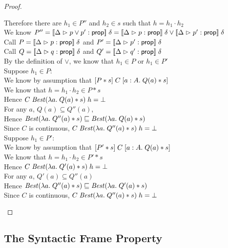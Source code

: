 \begin{proof}
\begin{tabbedproof}
    \oooooo Therefore there are $h_1 \in P''$ and $h_2 \in s$ such that $h = h_1 \cdot h_2$ \\
    \oooooo We know $P'' = [\![{{\Delta} \vartriangleright {p \vee p'} : {\mathsf{prop}}}]\!]\;\delta = 
                           [\![{{\Delta} \vartriangleright {p} : {\mathsf{prop}}}]\!]\;\delta \vee 
                           [\![{{\Delta} \vartriangleright {p'} : {\mathsf{prop}}}]\!]\;\delta$ \\ 
    \oooooo Call $P = [\![{{\Delta} \vartriangleright {p} : {\mathsf{prop}}}]\!]\;\delta$ and $P' = [\![{{\Delta} \vartriangleright {p'} : {\mathsf{prop}}}]\!]\;\delta$ \\
    \oooooo Call $Q = [\![{{\Delta} \vartriangleright {q} : {\mathsf{prop}}}]\!]\;\delta$ and $Q' = [\![{{\Delta} \vartriangleright {q'} : {\mathsf{prop}}}]\!]\;\delta$ \\
    \oooooo By the definition of $\vee$, we know that $h_1 \in P$ or $h_1 \in P'$ \\
    \oooooo Suppose $h_1 \in P$: \\
    \ooooooo We know by assumption that $[{P * s}]\;{C}\;[{a:A}.\;{Q(a) * s}]$ \\
    \ooooooo We know that $h = h_1 \cdot h_2 \in P * s$ \\
    \ooooooo Hence $C\;\mathit{Best}(\lambda a.\;Q(a) * s)\;h = \bot$ \\
    \ooooooo For any $a$, $Q(a) \subseteq Q''(a)$, \\
    \ooooooo Hence $\mathit{Best}(\lambda a.\;Q''(a) * s) \sqsubseteq \mathit{Best}(\lambda a.\;Q(a) * s)$ \\ 
    \ooooooo Since $C$ is continuous, $C\;\mathit{Best}(\lambda a.\;Q''(a) * s)\;h = \bot$ \\
    \oooooo Suppose $h_1 \in P'$: \\
    \ooooooo We know by assumption that $[{P' * s}]\;{C}\;[{a:A}.\;{Q(a) * s}]$ \\
    \ooooooo We know that $h = h_1 \cdot h_2 \in P' * s$ \\
    \ooooooo Hence $C\;\mathit{Best}(\lambda a.\;Q'(a) * s)\;h = \bot$ \\
    \ooooooo For any $a$, $Q'(a) \subseteq Q''(a)$ \\
    \ooooooo Hence $\mathit{Best}(\lambda a.\;Q''(a) * s) \sqsubseteq \mathit{Best}(\lambda a.\;Q'(a) * s)$ \\
    \ooooooo Since $C$ is continuous, $C\;\mathit{Best}(\lambda a.\;Q''(a) * s)\;h = \bot$ \\
  \end{tabbedproof}
\end{proof}



\subsection{The Syntactic Frame Property}

